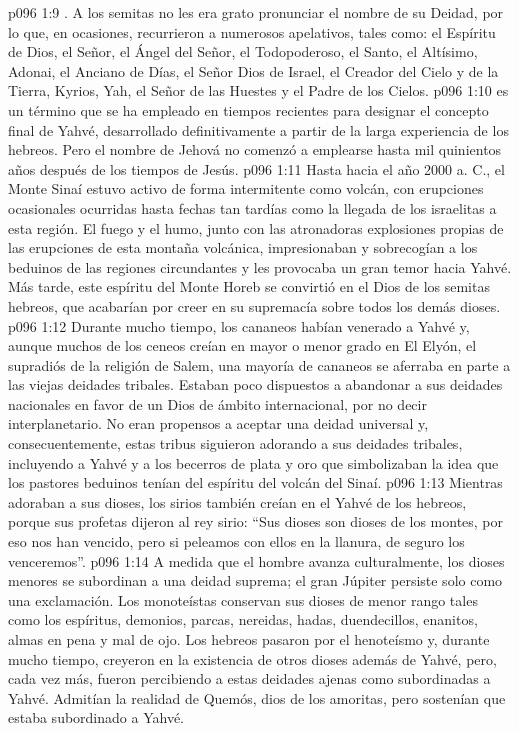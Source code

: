 \vs p096 1:9 . A los semitas no les era grato pronunciar el nombre de su Deidad, por lo que, en ocasiones, recurrieron a numerosos apelativos, tales como: el Espíritu de Dios, el Señor, el Ángel del Señor, el Todopoderoso, el Santo, el Altísimo, Adonai, el Anciano de Días, el Señor Dios de Israel, el Creador del Cielo y de la Tierra, Kyrios, Yah, el Señor de las Huestes y el Padre de los Cielos.
\vs p096 1:10 \pc {} es un término que se ha empleado en tiempos recientes para designar el concepto final de Yahvé, desarrollado definitivamente a partir de la larga experiencia de los hebreos. Pero el nombre de Jehová no comenzó a emplearse hasta mil quinientos años después de los tiempos de Jesús.
\vs p096 1:11 \pc Hasta hacia el año 2000 a. C., el Monte Sinaí estuvo activo de forma intermitente como volcán, con erupciones ocasionales ocurridas hasta fechas tan tardías como la llegada de los israelitas a esta región. El fuego y el humo, junto con las atronadoras explosiones propias de las erupciones de esta montaña volcánica, impresionaban y sobrecogían a los beduinos de las regiones circundantes y les provocaba un gran temor hacia Yahvé. Más tarde, este espíritu del Monte Horeb se convirtió en el Dios de los semitas hebreos, que acabarían por creer en su supremacía sobre todos los demás dioses.
\vs p096 1:12 Durante mucho tiempo, los cananeos habían venerado a Yahvé y, aunque muchos de los ceneos creían en mayor o menor grado en El Elyón, el supradiós de la religión de Salem, una mayoría de cananeos se aferraba en parte a las viejas deidades tribales. Estaban poco dispuestos a abandonar a sus deidades nacionales en favor de un Dios de ámbito internacional, por no decir interplanetario. No eran propensos a aceptar una deidad universal y, consecuentemente, estas tribus siguieron adorando a sus deidades tribales, incluyendo a Yahvé y a los becerros de plata y oro que simbolizaban la idea que los pastores beduinos tenían del espíritu del volcán del Sinaí.
\vs p096 1:13 Mientras adoraban a sus dioses, los sirios también creían en el Yahvé de los hebreos, porque sus profetas dijeron al rey sirio: “Sus dioses son dioses de los montes, por eso nos han vencido, pero si peleamos con ellos en la llanura, de seguro los venceremos”.
\vs p096 1:14 A medida que el hombre avanza culturalmente, los dioses menores se subordinan a una deidad suprema; el gran Júpiter persiste solo como una exclamación. Los monoteístas conservan sus dioses de menor rango tales como los espíritus, demonios, parcas, nereidas, hadas, duendecillos, enanitos, almas en pena y mal de ojo. Los hebreos pasaron por el henoteísmo y, durante mucho tiempo, creyeron en la existencia de otros dioses además de Yahvé, pero, cada vez más, fueron percibiendo a estas deidades ajenas como subordinadas a Yahvé. Admitían la realidad de Quemós, dios de los amoritas, pero sostenían que estaba subordinado a Yahvé.
